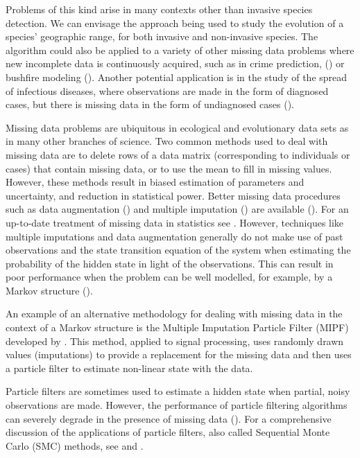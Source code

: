Problems of this kind arise in many contexts other than invasive species detection. We can envisage the approach being used to study the evolution of a species' geographic range, for both invasive and non-invasive species. The algorithm could also be applied to a variety of other missing data problems where new incomplete data is continuously acquired, such as in crime prediction, (\cite{Malathy}) or bushfire modeling (\cite{Beer}). Another potential application is in the study of the spread of infectious diseases, where observations are made in the form of diagnosed cases, but there is missing data in the form of undiagnosed cases (\cite{O'Neill}). 

Missing data problems are ubiquitous in ecological and evolutionary data sets as in many other branches of science. Two common methods used to deal with missing data are to delete rows of a data matrix (corresponding to individuals or cases) that contain missing data, or to use the mean to fill in missing values. However, these methods result in biased estimation of parameters and uncertainty, and reduction in statistical power. Better missing data procedures such as data augmentation (\cite{Tanner}) and multiple imputation (\cite{RubinMI}) are available  (\cite{Nakagawa}).
For an up-to-date treatment of missing data in statistics see \cite{Little}.
However, techniques like multiple imputations and data augmentation generally do not make use of past observations and the state transition equation of the system when estimating the probability of the hidden state in light of the observations. This can result in poor performance when the problem can be well modelled, for example, by a Markov structure (\cite{Zhang}).

An example of an alternative methodology for dealing with missing data in the context of a Markov structure is the Multiple Imputation Particle Filter (MIPF) developed by \cite{Zhang}. This method, applied to signal processing, uses randomly drawn values (imputations) to provide a replacement for the missing data and then uses a particle filter to estimate non-linear state with the data.

Particle filters are sometimes used to estimate a hidden state when partial, noisy observations are made. However, the performance of particle filtering algorithms can severely degrade in the presence of missing data (\cite{Zhang}). For a comprehensive discussion of the applications of particle filters, also called Sequential Monte Carlo (SMC) methods, see \cite{Cappe} and \cite{Doucet}.

